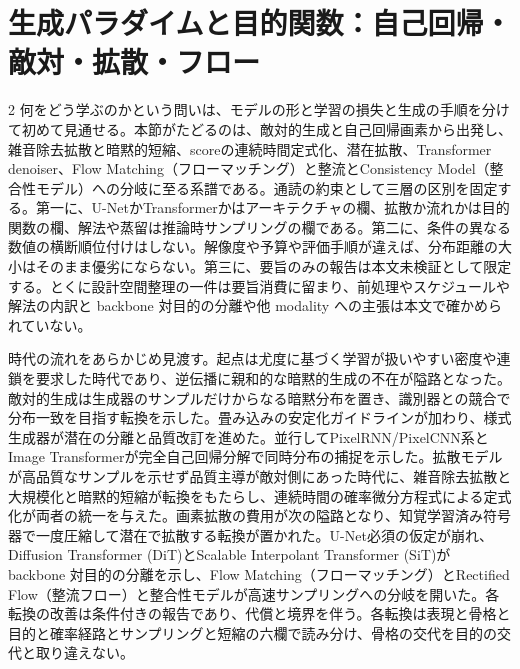 \documentclass[lualatex,a4paper,10pt]{jlreq}
\begin{document}
\section{生成パラダイムと目的関数：自己回帰・敵対・拡散・フロー}
\label{sec:paradigms}

\begin{multicols}{2}
\raggedcolumns
何をどう学ぶのかという問いは、モデルの形と学習の損失と生成の手順を分けて初めて見通せる。本節がたどるのは、敵対的生成と自己回帰画素から出発し、雑音除去拡散と暗黙的短縮、scoreの連続時間定式化、潜在拡散、Transformer denoiser、Flow Matching（フローマッチング）と整流とConsistency Model（整合性モデル）への分岐に至る系譜である\autocite{btd013,btd019,btd023}。通読の約束として三層の区別を固定する。第一に、U-NetかTransformerかはアーキテクチャの欄、拡散か流れかは目的関数の欄、解法や蒸留は推論時サンプリングの欄である。第二に、条件の異なる数値の横断順位付けはしない。解像度や予算や評価手順が違えば、分布距離の大小はそのまま優劣にならない。第三に、要旨のみの報告は本文未検証として限定する。とくに設計空間整理の一件は要旨消費に留まり、前処理やスケジュールや解法の内訳と backbone 対目的の分離や他 modality への主張は本文で確かめられていない\autocite{btd022}。

時代の流れをあらかじめ見渡す。起点は尤度に基づく学習が扱いやすい密度や連鎖を要求した時代であり、逆伝播に親和的な暗黙的生成の不在が隘路となった。敵対的生成は生成器のサンプルだけからなる暗黙分布を置き、識別器との競合で分布一致を目指す転換を示した\autocite{btd013}。畳み込みの安定化ガイドラインが加わり\autocite{btd014}、様式生成器が潜在の分離と品質改訂を進めた\autocite{btd015,btd016}。並行してPixelRNN/PixelCNN系とImage Transformerが完全自己回帰分解で同時分布の捕捉を示した\autocite{btd017,btd018}。拡散モデルが高品質なサンプルを示せず品質主導が敵対側にあった時代に、雑音除去拡散と大規模化と暗黙的短縮が転換をもたらし\autocite{btd019,btd020,btd030}、連続時間の確率微分方程式による定式化が両者の統一を与えた\autocite{btd021}。画素拡散の費用が次の隘路となり、知覚学習済み符号器で一度圧縮して潜在で拡散する転換が置かれた\autocite{btd023}。U-Net必須の仮定が崩れ、Diffusion Transformer (DiT)とScalable Interpolant Transformer (SiT)が backbone 対目的の分離を示し\autocite{btd025,btd026}、Flow Matching（フローマッチング）とRectified Flow（整流フロー）と整合性モデルが高速サンプリングへの分岐を開いた\autocite{btd027,btd028,btd029}。各転換の改善は条件付きの報告であり、代償と境界を伴う。各転換は表現と骨格と目的と確率経路とサンプリングと短縮の六欄で読み分け、骨格の交代を目的の交代と取り違えない。
\end{multicols}
\end{document}
